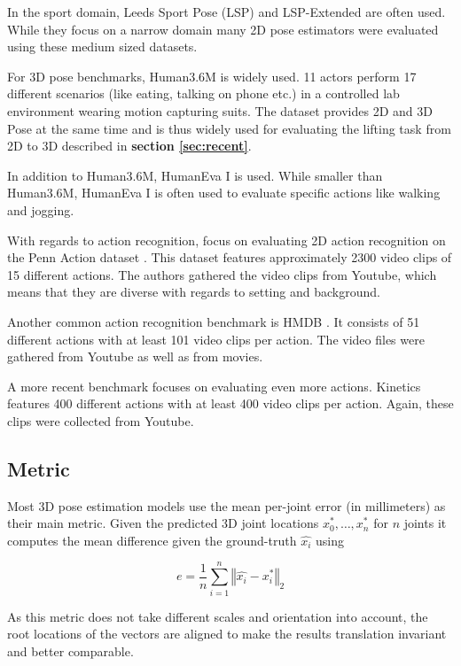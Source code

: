 \documentclass[twoside]{article}
\begin{document}
\begin{multicols}{2}
In the sport domain, Leeds Sport Pose (LSP) \cite{johnson_clustered_2010} and LSP-Extended \cite{johnson_learning_2011} are often used.
While they focus on a narrow domain many 2D pose estimators were evaluated using these medium sized datasets.

For 3D pose benchmarks, Human3.6M \cite{ionescu_human3.6m:_2014} is widely used.
11 actors perform 17 different scenarios (like eating, talking on phone etc.) in a controlled lab environment wearing motion capturing suits.
The dataset provides 2D and 3D Pose at the same time and is thus widely used for evaluating the lifting task from 2D to 3D described in \textbf{section \ref{sec:recent}}.

In addition to Human3.6M, HumanEva I \cite{sigal_humaneva:_2010} is used.
While smaller than Human3.6M, HumanEva I is often used to evaluate specific actions like walking and jogging.

With regards to action recognition, \cite{luvizon_2d/3d_2018} focus on evaluating 2D action recognition on the Penn Action dataset \cite{zhang_actemes_2013}.
This dataset features approximately 2300 video clips of 15 different actions.
The authors gathered the video clips from Youtube, which means that they are diverse with regards to setting and background.

Another common action recognition benchmark is HMDB \cite{kuehne_hmdb:_2011}.
It consists of 51 different actions with at least 101 video clips per action.
The video files were gathered from Youtube as well as from movies.

A more recent benchmark focuses on evaluating even more actions. Kinetics \cite{kay_kinetics_2017} features 400 different actions with at least 400 video clips per action. Again, these clips were collected from Youtube.


\subsection{Metric}

Most 3D pose estimation models use the mean per-joint error (in millimeters) as their main metric.
Given the predicted 3D joint locations $x_0^{*}, \dots, x_n^{*}$ for $n$ joints it computes the mean difference given the ground-truth $\hat{x_i}$ using

\newcommand\norm[1]{\left\Vert#1\right\Vert}

\[
    e = \frac{1}{n} \sum_{i=1}^{n} \norm{\hat{x_i} - x_i^{*}}_2
\]

As this metric does not take different scales and orientation into account, the root locations of the vectors are aligned to make the results translation invariant and better comparable.


\end{multicols}
\end{document}
